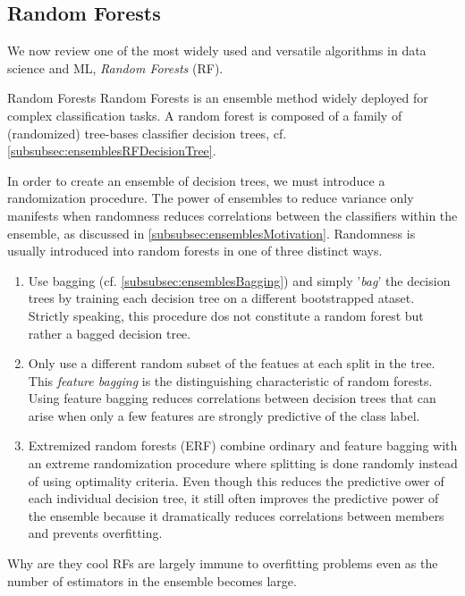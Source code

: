 \subsection{Random Forests}
\label{subsec:ensemblesRandomForest}
We now review one of the most widely used and versatile algorithms in data science and ML, \emph{Random Forests} (RF).
\begin{mybox}{Random Forests}
	Random Forests is an ensemble method widely deployed for complex classification tasks. A random forest is composed of a family of (randomized) tree-bases classifier decision trees, cf. \ref{subsubsec:ensemblesRFDecisionTree}.
\end{mybox}
In order to create an ensemble of decision trees, we must introduce a randomization procedure. The power of ensembles to reduce variance only manifests when randomness reduces correlations between the classifiers within the ensemble, as discussed in \ref{subsubsec:ensemblesMotivation}. Randomness is usually introduced into random forests in one of three distinct ways.
\begin{enumerate}
	\item Use bagging (cf. \ref{subsubsec:ensemblesBagging}) and simply ’\emph{bag}’ the decision trees by training each decision tree on a different bootstrapped ataset. Strictly speaking, this procedure dos not constitute a random forest but rather a bagged decision tree.
	\item Only use a different random subset of the featues at each split in the tree. This \emph{feature bagging} is the distinguishing characteristic of random forests. Using feature bagging reduces correlations between decision trees that can arise when only a few features are strongly predictive of the class label. 
	\item Extremized random forests (ERF) combine ordinary and feature bagging with an extreme randomization procedure where splitting is done randomly instead of using optimality criteria. Even though this reduces the predictive ower of each individual decision tree, it still often improves the predictive power of the ensemble because it dramatically reduces correlations between members and prevents overfitting.
\end{enumerate}
\begin{mybox}{Why are they cool}
	RFs are largely immune to overfitting problems even as the number of estimators in the ensemble becomes large.
\end{mybox}















